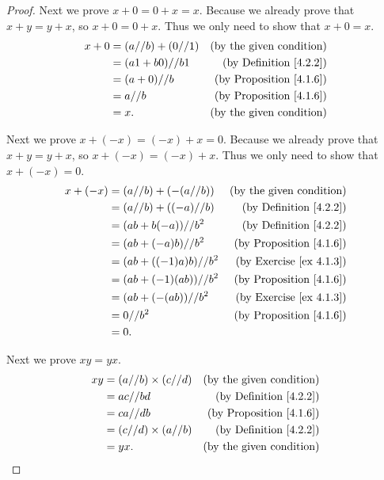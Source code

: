 \begin{proof}
    Next we prove \(x + 0 = 0 + x = x\).
    Because we already prove that \(x + y = y + x\), so \(x + 0 = 0 + x\).
    Thus we only need to show that \(x + 0 = x\).
    \begin{align*}
        x + 0 & = (a // b) + (0 // 1) & \text{(by the given condition)}     \\
              & = (a1 + b0) // b1     & \text{(by Definition \ref{4.2.2})}  \\
              & = (a + 0) // b        & \text{(by Proposition \ref{4.1.6})} \\
              & = a // b              & \text{(by Proposition \ref{4.1.6})} \\
              & = x.                  & \text{(by the given condition)}
    \end{align*}

    Next we prove \(x + (-x) = (-x) + x = 0\).
    Because we already prove that \(x + y = y + x\), so \(x + (-x) = (-x) + x\).
    Thus we only need to show that \(x + (-x) = 0\).
    \begin{align*}
        x + (-x) & = (a // b) + (-(a // b)) & \text{(by the given condition)}     \\
                 & = (a // b) + ((-a) // b) & \text{(by Definition \ref{4.2.2})}  \\
                 & = (ab + b(-a)) // b^2    & \text{(by Definition \ref{4.2.2})}  \\
                 & = (ab + (-a)b) // b^2    & \text{(by Proposition \ref{4.1.6})} \\
                 & = (ab + ((-1)a)b) // b^2 & \text{(by Exercise \ref{ex 4.1.3})} \\
                 & = (ab + (-1)(ab)) // b^2 & \text{(by Proposition \ref{4.1.6})} \\
                 & = (ab + (-(ab)) // b^2   & \text{(by Exercise \ref{ex 4.1.3})} \\
                 & = 0 // b^2               & \text{(by Proposition \ref{4.1.6})} \\
                 & = 0.
    \end{align*}

    Next we prove \(xy = yx\).
    \begin{align*}
        xy & = (a // b) \times (c // d) & \text{(by the given condition)}     \\
           & = ac // bd                 & \text{(by Definition \ref{4.2.2})}  \\
           & = ca // db                 & \text{(by Proposition \ref{4.1.6})} \\
           & = (c // d) \times (a // b) & \text{(by Definition \ref{4.2.2})}  \\
           & = yx.                      & \text{(by the given condition)}
    \end{align*}


\end{proof}
